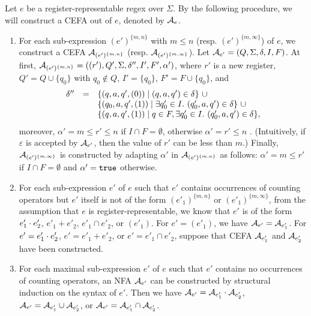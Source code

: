 Let $e$ be a register-representable regex over $\Sigma$. By the following procedure, we will construct a CEFA out of $e$, denoted by $\mathcal{A}_e$. 
\begin{enumerate}
%
\item For each sub-expression $(e')^{\{m,n\}}$ with $m \le n$ (resp. $(e')^{\{m, \infty\}}$) of $e$, we construct a CEFA $\mathcal{A}_{(e')^{\{m,n\}}}$ (resp. $\mathcal{A}_{(e')^{\{m, \infty\}}}$). Let $\mathcal{A}_{e'} = (Q, \Sigma, \delta, I, F)$.  
%
At first, $\mathcal{A}_{(e')^{\{m,n\}}} = ((r'), Q', \Sigma, \delta'', I', F', \alpha')$, where $r'$ is a new register, $Q' = Q \cup \{q_0\}$ with $q_0 \not \in Q$, $I' = \{q_0\}$, $F'= F \cup \{q_0\}$, and 
%
$$
\begin{array}{l c l}
\delta'' & = & \{(q, a, q', (0)) \mid (q, a, q') \in \delta\}\  \cup \\
& & \{(q_0, a, q', (1))  \mid \exists q'_0 \in I.\ (q'_0, a, q') \in \delta\}\ \cup \\
& & \{(q, a, q', (1)) \mid q \in F, \exists q'_0 \in I.\ (q'_0, a, q') \in \delta\},
\end{array}
$$ 
%
moreover, $\alpha' = m \le r' \le n$ if $I \cap F = \emptyset$, otherwise $\alpha' = r' \le n$ .  (Intuitively, if $\varepsilon$ is accepted by $\mathcal{A}_{e'}$, then the value of $r'$ can be less than $m$.) Finally, $\mathcal{A}_{(e')^{\{m, \infty\}}}$ is constructed by adapting $\alpha'$ in $\mathcal{A}_{(e')^{\{m,n\}}}$ as follows: $\alpha' = m \le r'$ if $I \cap F = \emptyset$ and $\alpha' = \mathtt{true}$ otherwise. 
%

\item For each sub-expression $e'$ of $e$ such that $e'$ contains occurrences of counting operators but $e'$ itself is not of the form $(e'_1)^{\{m,n\}}$ or $(e'_1)^{\{m,\infty\}}$, from the assumption that $e$ is register-representable, we know that $e'$ is of the form $e'_1 \cdot e'_2$, $e'_1 + e'_2$, $e'_1 \cap e'_2$, or $(e'_1)$. For $e' = (e'_1)$, we have $\mathcal{A}_{e'} = \mathcal{A}_{e'_1}$. For $e' = e'_1 \cdot e'_2$, $e' = e'_1 + e'_2$, or $e' = e'_1 \cap e'_2$, suppose that CEFA $\mathcal{A}_{e'_1}$ and $\mathcal{A}_{e'_2}$ have been constructed. 

\item For each maximal sub-expression $e'$ of $e$ such that $e'$ contains no occurrences of counting operators, an NFA $\mathcal{A}_{e'}$ can be constructed by structural induction on the syntax of $e'$. 
Then we have $\mathcal{A}_{e'} = \mathcal{A}_{e'_1} \cdot \mathcal{A}_{e'_2}$, $\mathcal{A}_{e'} = \mathcal{A}_{e'_1} \cup \mathcal{A}_{e'_2}$, or $\mathcal{A}_{e'} = \mathcal{A}_{e'_1} \cap \mathcal{A}_{e'_2}$. 
\end{enumerate}

